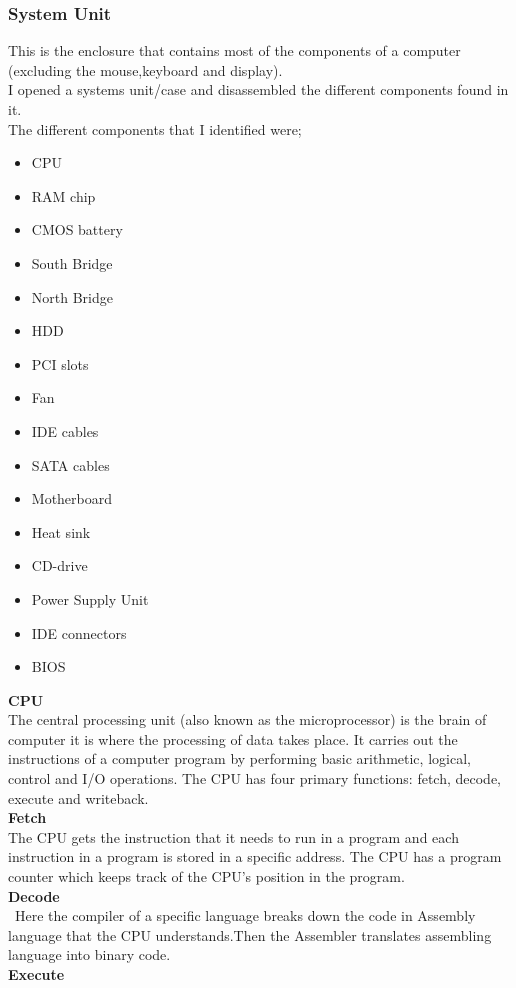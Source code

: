 \documentclass{article}
\begin{document}
\subsubsection{System Unit} \cite{morley2014understanding}
This is the enclosure that contains most of the components of a computer (excluding the mouse,keyboard and display).\\
I opened a systems unit/case and disassembled the different components found in it.\\
The different components that I identified were;
\begin{itemize}
\item CPU
\item  RAM chip
\item CMOS battery
\item South Bridge
\item North Bridge
\item HDD
\item PCI slots
\item Fan
\item IDE cables
 \item SATA cables
\item  Motherboard
 \item Heat sink
\item CD-drive
 \item Power Supply Unit
\item IDE connectors
\item BIOS
\end{itemize}
\textbf{CPU}\\
 The central processing unit (also known as the microprocessor) is the brain of computer it is where the processing of data takes place. It carries out the instructions of a computer program by performing basic arithmetic, logical, control and I/O operations. The CPU has four primary functions: fetch, decode, execute and writeback.\\
\textbf{Fetch}\\
 The CPU gets the instruction that it needs to run in a program and each instruction in a program is stored in a specific address. The CPU has a program counter which keeps track of the CPU’s position in the program.\\
\textbf{Decode}\\
\ Here the compiler of a specific language breaks down the code in Assembly language that the CPU understands.Then the Assembler translates assembling language into binary code.\\
\textbf{Execute}\\
\end{document}
